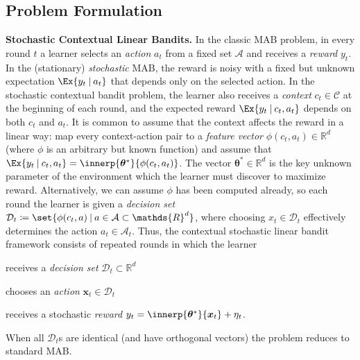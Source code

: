 \documentclass{article}
\renewcommand{\vec}[1]{\bm{#1}}
\newcommand{\defeq}{\coloneq}
\newcommand{\Real}{\mathds{R}}
\newcommand\given[1][\delimsize]{%
  \providecommand{\delimsize}{}
  \nonscript\:#1\vert\allowbreak\nonscript\:\mathopen{}
}
\newcommand{\A}{\mathcal{A}}
\newcommand{\C}{\mathcal{C}}
\newcommand{\D}{\mathcal{D}}
\renewcommand{\paragraph}[1]{\vspace{2pt}\noindent\textbf{#1}}
\begin{document}
\subsection{Problem Formulation}
\label{subsec:problem_formulation}
\paragraph{Stochastic Contextual Linear Bandits.}
In the classic MAB problem, in every round $t$ a learner
selects an \emph{action} $a_t$ from a fixed set $\A$ and receives a
\emph{reward} $y_t$.  In the (stationary) \emph{stochastic} MAB, the
reward is noisy with a fixed but unknown expectation
$\Ex{y_t\given a_t}$ that depends only on the selected action.
In the stochastic contextual bandit problem, the learner also receives
a \emph{context} $c_t\in\C$ at the beginning of each round, and the
expected reward $\Ex{y_t\given c_t,a_t}$ depends on both $c_t$ and
$a_t$.  It is common to assume that the context
affects the reward in a linear way: map every context-action pair to a
\emph{feature vector} $\phi(c_t,a_t)\in\Real^d$ (where $\phi$ is an
arbitrary but known function) and assume that
$\Ex{y_t\given c_t,a_t} = \innerp{\vec\theta^*}{\phi(c_t,a_t)}$.  The
vector $\vec\theta^*\in\Real^d$ is the key unknown parameter of the
environment which the learner must discover to maximize reward.
Alternatively, we can assume $\phi$ has been computed already, so each round the learner is given a
\emph{decision set}
$\D_t \defeq \set{\phi(c_t,a)\given a\in\A \subset \Real^d}$, where
choosing $x_t\in\D_t$ effectively determines the action
$a_t\in\A_t$.  Thus, the contextual stochastic linear bandit framework
consists of repeated rounds in which the learner
\begin{enumerate*}[(i),before=\unskip{: },itemjoin={{; }},itemjoin*={{; and }}]
\item receives a \emph{decision set} $\mathcal{D}_t \subset \Real^d$
\item chooses an \emph{action} $\vec x_t \in \mathcal{D}_t$
\item receives a stochastic \emph{reward}
  $y_t = \innerp{\vec\theta^*}{\vec x_t} + \eta_t$.
\end{enumerate*}
When all $\D_t$s are identical (and have orthogonal vectors) the problem reduces to standard MAB.
\end{document}
